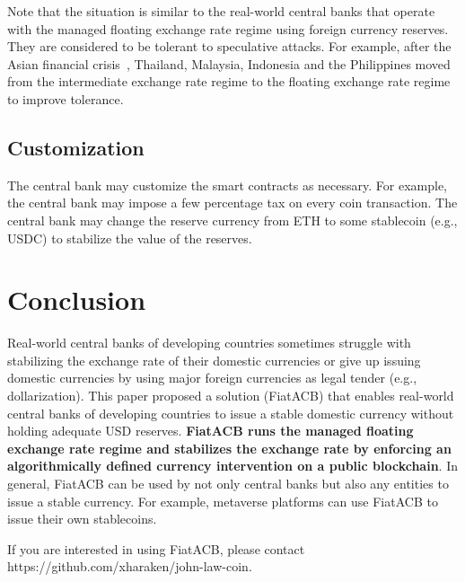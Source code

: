 \documentclass[dvipdfmx,a4paper]{article}
\begin{document}
Note that the situation is similar to the real-world central banks that operate with the managed floating exchange rate regime using foreign currency reserves. They are considered to be tolerant to speculative attacks. For example, after the Asian financial crisis~\cite{radelet1998east}, Thailand, Malaysia, Indonesia and the Philippines moved from the intermediate exchange rate regime to the floating exchange rate regime to improve tolerance.

\subsection{Customization}

The central bank may customize the smart contracts as necessary. For example, the central bank may impose a few percentage tax on every coin transaction. The central bank may change the reserve currency from ETH to some stablecoin (e.g., USDC) to stabilize the value of the reserves.

\section{Conclusion}

Real-world central banks of developing countries sometimes struggle with stabilizing the exchange rate of their domestic currencies or give up issuing domestic currencies by using major foreign currencies as legal tender (e.g., dollarization). This paper proposed a solution (FiatACB) that enables real-world central banks of developing countries to issue a stable domestic currency without holding adequate USD reserves. \textbf{FiatACB runs the managed floating exchange rate regime and stabilizes the exchange rate by enforcing an algorithmically defined currency intervention on a public blockchain}. In general, FiatACB can be used by not only central banks but also any entities to issue a stable currency. For example, metaverse platforms can use FiatACB to issue their own stablecoins.

If you are interested in using FiatACB, please contact https://github.com/xharaken/john-law-coin.



\end{document}
